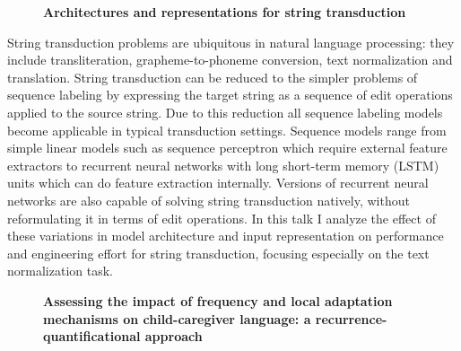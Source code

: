 \documentclass[10pt, a4paper, twopage, headinclude, footinclude, BCOR5mm]{book}
\begin{document}
\newpage

\begin{figure}[t!]
\centering
\large\textbf{Architectures and representations for string transduction}
\vspace*{0.5cm}
\end{figure}


\begin{table}[t!]
\end{table} 
\noindent
String transduction problems are ubiquitous in natural language processing: they include transliteration, grapheme-to-phoneme conversion, text normalization and translation. String transduction can be reduced to the simpler problems of sequence labeling by expressing the target string as a sequence of edit operations applied to the source string. Due to this reduction all sequence labeling models become applicable in typical transduction settings. Sequence models range from simple linear models such as sequence perceptron which require external feature extractors to recurrent neural networks with long short-term memory (LSTM) units which can do feature extraction internally. Versions of recurrent neural networks are also capable of solving string transduction natively, without reformulating it in terms of edit operations. In this talk I analyze the effect of these variations in model architecture and input representation on performance and engineering effort for string transduction, focusing especially on the text normalization task.   

\newpage

\begin{figure}[t!]
\centering
\large\textbf{Assessing the impact of frequency and local adaptation mechanisms on child-caregiver language: a recurrence-quantificational approach}
\vspace*{0.5cm}
\end{figure}
\end{document}
